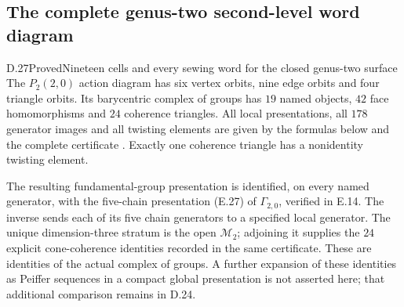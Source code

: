 \subsection{The complete genus-two second-level word diagram}

\begin{result}{D.27}{Proved}{Nineteen cells and every sewing word for the closed genus-two surface}
The $P_2(2,0)$ action diagram has six vertex orbits, nine edge
orbits and four triangle orbits.  Its barycentric complex of
groups has $19$ named objects, $42$ face homomorphisms and
$24$ coherence triangles.  All local presentations, all $178$
generator images and all twisting elements are given by the
formulas below and the complete certificate
.  Exactly one coherence triangle
has a nonidentity twisting element.

The resulting fundamental-group presentation is identified,
on every named generator, with the five-chain presentation (E.27) of
$\Gamma_{2,0}$, verified in E.14.  The inverse sends each of its five
chain generators to a specified local generator.  The unique
dimension-three stratum is the open $\mathcal M_2$; adjoining
it supplies the $24$ explicit cone-coherence identities recorded
in the same certificate.  These are identities of the actual
complex of groups.  A further expansion of these identities
as Peiffer sequences in a compact global presentation is not
asserted here; that additional comparison remains in D.24.
\end{result}
